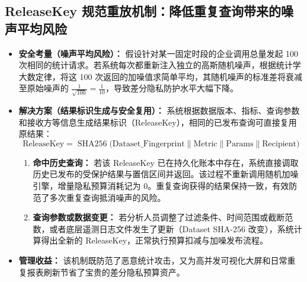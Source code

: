 \subsection{ReleaseKey 规范重放机制：降低重复查询带来的噪声平均风险}
\begin{itemize}[leftmargin=2em]
  \item \textbf{安全考量（噪声平均风险）：} 假设针对某一固定时段的企业调用总量发起 100 次相同的统计请求。若系统每次都重新注入独立的高斯随机噪声，根据统计学大数定律，将这 100 次返回的加噪值求简单平均，其随机噪声的标准差将衰减至原始噪声的 $\frac{1}{\sqrt{100}} = \frac{1}{10}$，导致差分隐私防护水平大幅下降。
  \item \textbf{解决方案（结果标识生成与安全复用）：} 系统根据数据版本、指标、查询参数和接收方等信息生成结果标识（ReleaseKey），相同的已发布查询可直接复用原结果：
  \begin{equation}
    \text{ReleaseKey} = \operatorname{SHA256}\Big(\text{Dataset\_Fingerprint} \parallel \text{Metric} \parallel \text{Params} \parallel \text{Recipient}\Big)
  \end{equation}
  \begin{enumerate}[label=\alph*., leftmargin=1.5em]
    \item \textbf{命中历史查询：} 若该 ReleaseKey 已在持久化账本中存在，系统直接调取历史已发布的受保护结果与置信区间并返回。该过程不重新调用随机加噪引擎，增量隐私预算消耗记为 0。重复查询获得的结果保持一致，有效防范了多次重复查询抵消噪声的风险。
    \item \textbf{查询参数或数据变更：} 若分析人员调整了过滤条件、时间范围或截断范数，或者底层遥测日志文件发生了更新（Dataset SHA-256 改变），系统计算得出全新的 ReleaseKey，正常执行预算扣减与加噪发布流程。
  \end{enumerate}
  \item \textbf{管理收益：} 该机制既防范了恶意统计攻击，又为高并发可视化大屏和日常重复报表刷新节省了宝贵的差分隐私预算资产。
\end{itemize}
